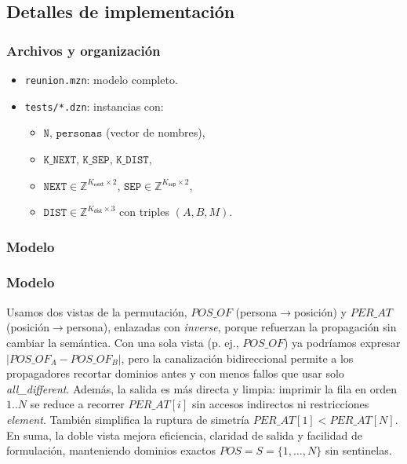 
\subsection{Detalles de implementación}\label{sec:05-reunion-impl}

\subsubsection*{Archivos y organización}
\begin{itemize}
  \item \texttt{reunion.mzn}: modelo completo.
  \item \texttt{tests/*.dzn}: instancias con:
    \begin{itemize}
      \item \(\texttt{N}\), \(\texttt{personas}\) (vector de nombres),
      \item \(\texttt{K\_NEXT}\), \(\texttt{K\_SEP}\), \(\texttt{K\_DIST}\),
      \item \(\texttt{NEXT}\in \mathbb{Z}^{K_{\textsf{next}}\times 2}\), \(\texttt{SEP}\in \mathbb{Z}^{K_{\textsf{sep}}\times 2}\),
      \item \(\texttt{DIST}\in \mathbb{Z}^{K_{\textsf{dist}}\times 3}\) con triples \((A,B,M)\).
    \end{itemize}
\end{itemize}

\subsubsection*{Modelo}
\subsubsection*{Modelo}
Usamos dos vistas de la permutación, \(POS\_OF\) (persona\(\to\)posición) y \(PER\_AT\) (posición\(\to\)persona), enlazadas con \textit{inverse}, porque refuerzan la propagación sin cambiar la semántica. Con una sola vista (p. ej., \(POS\_OF\)) ya podríamos expresar \(|POS\_OF_A-POS\_OF_B|\), pero la canalización bidireccional permite a los propagadores recortar dominios antes y con menos fallos que usar solo \textit{all\_different}. Además, la salida es más directa y limpia: imprimir la fila en orden \(1..N\) se reduce a recorrer \(PER\_AT[i]\) sin accesos indirectos ni restricciones \textit{element}. También simplifica la ruptura de simetría \(PER\_AT[1]<PER\_AT[N]\). En suma, la doble vista mejora eficiencia, claridad de salida y facilidad de formulación, manteniendo dominios exactos \(POS=S=\{1,\dots,N\}\) sin sentinelas.


